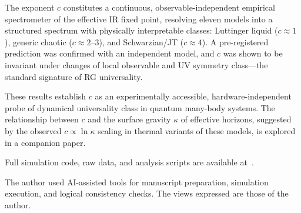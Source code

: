 \documentclass[aps,prl,twocolumn,showpacs,preprintnumbers,superscriptaddress]{revtex4-2}
\begin{document}
The exponent $c$ constitutes a continuous, observable-independent
empirical spectrometer of the effective IR fixed point, resolving
eleven models into a structured spectrum with physically interpretable
classes: Luttinger liquid ($c \approx 1$), generic chaotic
($c \approx 2$--$3$), and Schwarzian/JT ($c \approx 4$).
A pre-registered prediction was confirmed with an independent model,
and $c$ was shown to be invariant under changes of local observable and
UV symmetry class---the standard signature of RG universality.

These results establish $c$ as an experimentally accessible, hardware-independent
probe of dynamical universality class in quantum many-body systems.
The relationship between $c$ and the surface gravity $\kappa$ of effective
horizons, suggested by the observed $c \propto \ln\kappa$ scaling in
thermal variants of these models, is explored in a companion paper.

Full simulation code, raw data, and analysis scripts are available
at~\cite{PerezEugenio2026c}.

\begin{acknowledgments}
The author used AI-assisted tools for manuscript preparation, simulation
execution, and logical consistency checks.
The views expressed are those of the author.
\end{acknowledgments}



\end{document}
